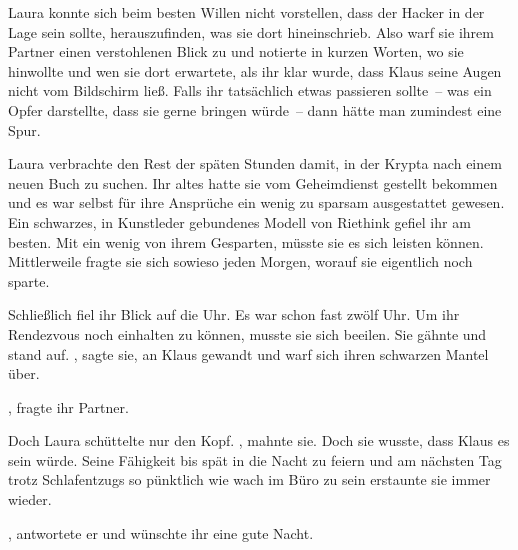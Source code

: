 \par

Laura konnte sich beim besten Willen nicht vorstellen, dass der Hacker in der Lage sein sollte, herauszufinden, was sie dort hineinschrieb. Also warf sie ihrem Partner einen verstohlenen Blick zu und notierte in kurzen Worten, wo sie hinwollte und wen sie dort erwartete, als ihr klar wurde, dass Klaus seine Augen nicht vom Bildschirm ließ. Falls ihr tatsächlich etwas passieren sollte~-- was ein Opfer darstellte, dass sie gerne bringen würde~-- dann hätte man zumindest eine Spur.

\par

Laura verbrachte den Rest der späten Stunden damit, in der Krypta nach einem neuen Buch zu suchen. Ihr altes hatte sie vom Geheimdienst gestellt bekommen und es war selbst für ihre Ansprüche ein wenig zu sparsam ausgestattet gewesen. Ein schwarzes, in Kunstleder gebundenes Modell von Riethink gefiel ihr am besten. Mit ein wenig von ihrem Gesparten, müsste sie es sich leisten können. Mittlerweile fragte sie sich sowieso jeden Morgen, worauf sie eigentlich noch sparte.

\par

Schließlich fiel ihr Blick auf die Uhr. Es war schon fast zwölf Uhr. Um ihr Rendezvous noch einhalten zu können, musste sie sich beeilen. Sie gähnte und stand auf. , sagte sie, an Klaus gewandt und warf sich ihren schwarzen Mantel über. 

\par

, fragte ihr Partner.

\par

Doch Laura schüttelte nur den Kopf. , mahnte sie. Doch sie wusste, dass Klaus es sein würde. Seine Fähigkeit bis spät in die Nacht zu feiern und am nächsten Tag trotz Schlafentzugs so pünktlich wie wach im Büro zu sein erstaunte sie immer wieder.

\par

, antwortete er und wünschte ihr eine gute Nacht.

\par

